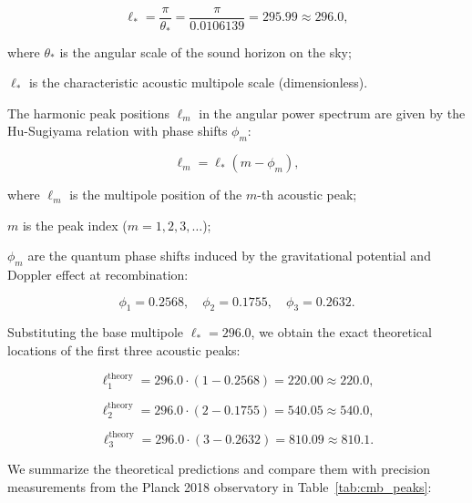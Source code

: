 \documentclass[11pt,a4paper]{article}
\theoremstyle{definition}
\begin{document}
\begin{equation}\label{eq:4.60}\tag{4.60}
\ell_* = \frac{\pi}{\theta_*} = \frac{\pi}{0.0106139} = 295.99 \approx 296.0,
\end{equation}

where $\theta_*$ is the angular scale of the sound horizon on the sky;  

$\ell_*$ is the characteristic acoustic multipole scale (dimensionless).

The harmonic peak positions $\ell_m$ in the angular power spectrum are given by the Hu-Sugiyama relation \cite{ref35} with phase shifts $\phi_m$:

\begin{equation}\label{eq:4.61}\tag{4.61}
\ell_m = \ell_* (m - \phi_m),
\end{equation}

where $\ell_m$ is the multipole position of the $m$-th acoustic peak;  

$m$ is the peak index ($m = 1, 2, 3, \dots$);  

$\phi_m$ are the quantum phase shifts induced by the gravitational potential and Doppler effect at recombination:

\begin{equation}\label{eq:4.62}\tag{4.62}
\phi_1 = 0.2568, \quad \phi_2 = 0.1755, \quad \phi_3 = 0.2632.
\end{equation}

Substituting the base multipole $\ell_* = 296.0$, we obtain the exact theoretical locations of the first three acoustic peaks:

\begin{equation}\label{eq:4.63}\tag{4.63}
\ell_1^{\text{theory}} = 296.0 \cdot (1 - 0.2568) = 220.00 \approx 220.0,
\end{equation}

\begin{equation}\label{eq:4.64}\tag{4.64}
\ell_2^{\text{theory}} = 296.0 \cdot (2 - 0.1755) = 540.05 \approx 540.0,
\end{equation}

\begin{equation}\label{eq:4.65}\tag{4.65}
\ell_3^{\text{theory}} = 296.0 \cdot (3 - 0.2632) = 810.09 \approx 810.1.
\end{equation}

We summarize the theoretical predictions and compare them with precision measurements from the Planck 2018 observatory in Table~\ref{tab:cmb_peaks}:
\end{document}
